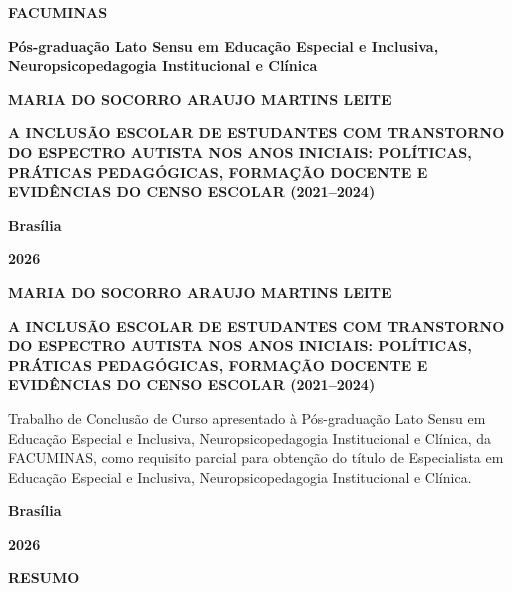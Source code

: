 \begin{titlepage}
\centering
{\bfseries FACUMINAS\par}
{\bfseries Pós-graduação Lato Sensu em Educação Especial e Inclusiva, Neuropsicopedagogia Institucional e Clínica\par}
\vspace{3.5cm}
{\bfseries MARIA DO SOCORRO ARAUJO MARTINS LEITE\par}
\vspace{3.5cm}
{\bfseries A INCLUSÃO ESCOLAR DE ESTUDANTES COM TRANSTORNO DO ESPECTRO AUTISTA NOS ANOS INICIAIS: POLÍTICAS, PRÁTICAS PEDAGÓGICAS, FORMAÇÃO DOCENTE E EVIDÊNCIAS DO CENSO ESCOLAR (2021--2024)\par}
\vfill
{\bfseries Brasília\par}
{\bfseries 2026\par}
\end{titlepage}

\begin{titlepage}
\centering
{\bfseries MARIA DO SOCORRO ARAUJO MARTINS LEITE\par}
\vspace{3cm}
{\bfseries A INCLUSÃO ESCOLAR DE ESTUDANTES COM TRANSTORNO DO ESPECTRO AUTISTA NOS ANOS INICIAIS: POLÍTICAS, PRÁTICAS PEDAGÓGICAS, FORMAÇÃO DOCENTE E EVIDÊNCIAS DO CENSO ESCOLAR (2021--2024)\par}
\vspace{2.5cm}
\begin{flushright}
\begin{minipage}{9cm}
\small
Trabalho de Conclusão de Curso apresentado à Pós-graduação Lato Sensu em Educação Especial e Inclusiva, \mbox{Neuropsicopedagogia} Institucional e Clínica, da \mbox{FACUMINAS}, como requisito parcial para obtenção do título de Especialista em Educação Especial e Inclusiva, \mbox{Neuropsicopedagogia} Institucional e Clínica.\par
\end{minipage}
\end{flushright}
\vfill
{\bfseries Brasília\par}
{\bfseries 2026\par}
\end{titlepage}

\begin{center}
\textbf{RESUMO}
\end{center}

